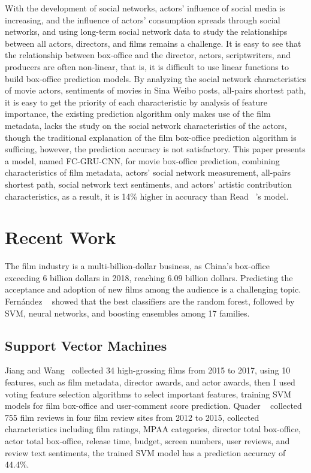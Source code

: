 \documentclass[review]{cvpr}
\begin{document}
  With the development of social networks, actors' influence of social media is increasing, and the influence of actors' consumption spreads through social networks,
  and using long-term social network data to study the relationships between all actors, directors, and films remains a challenge.
  It is easy to see that the relationship between box-office and the director, actors, scriptwriters, and producers are often non-linear, that is,
  it is difficult to use linear functions to build box-office prediction models.
  By analyzing the social network characteristics of movie actors, sentiments of movies in Sina Weibo posts, all-pairs shortest path,
  it is easy to get the priority of each characteristic by analysis of feature importance,
  the existing prediction algorithm only makes use of the film metadata, lacks the study on the social network characteristics of the actors,
  though the traditional explanation of the film box-office prediction algorithm is sufficing, however, the prediction accuracy is not satisfactory.
  This paper presents a model, named FC-GRU-CNN, for movie box-office prediction, combining characteristics of film metadata, actors' social network measurement,
  all-pairs shortest path, social network text sentiments, and actors' artistic contribution characteristics,
  as a result, it is 14\% higher in accuracy than Read \etal ~\cite{read2016learning}'s model.


\section{Recent Work}

  The film industry is a multi-billion-dollar business, as China's box-office exceeding 6 billion dollars in 2018, reaching 6.09 billion dollars.
  Predicting the acceptance and adoption of new films among the audience is a challenging topic.
  Fern{\'a}ndez \etal ~\cite{fernandez2014we} showed that the best classifiers are the random forest,
  followed by SVM, neural networks, and boosting ensembles among 17 families.


\subsection{Support Vector Machines}

  Jiang and Wang~\cite{jiang2018predicting} collected 34 high-grossing films from 2015 to 2017, using 10 features, such as film metadata, director awards, and actor awards, then I used voting feature selection algorithms to select important features,
  training SVM models for film box-office and user-comment score prediction.
  Quader \etal~\cite{quader2017machine} collected 755 film reviews in four film review sites from 2012 to 2015, collected characteristics including film ratings, MPAA categories,
  director total box-office, actor total box-office, release time, budget, screen numbers, user reviews, and review text sentiments,
  the trained SVM model has a prediction accuracy of 44.4\%.
\end{document}
